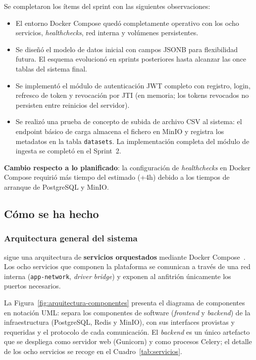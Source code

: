 Se completaron los ítems del sprint con las siguientes observaciones:

\begin{itemize}
  \item El entorno Docker Compose quedó completamente operativo con los ocho
    servicios, \emph{healthchecks}, red interna y volúmenes persistentes.
  \item Se diseñó el modelo de datos inicial con campos JSONB para
    flexibilidad futura.  El esquema evolucionó en sprints posteriores hasta
    alcanzar las once tablas del sistema final.
  \item Se implementó el módulo de autenticación JWT completo con registro,
    login, refresco de token y revocación por \ac{JTI} (en memoria; los tokens
    revocados no persisten entre reinicios del servidor).
  \item Se realizó una prueba de concepto de subida de archivo \ac{CSV} al sistema:
    el endpoint básico de carga almacena el fichero en MinIO y registra los
    metadatos en la tabla \texttt{datasets}.  La implementación completa del
    módulo de ingesta se completó en el Sprint~2.
\end{itemize}

\textbf{Cambio respecto a lo planificado}: la configuración de
\emph{healthchecks} en Docker Compose requirió más tiempo del estimado
(+4h) debido a los tiempos de arranque de PostgreSQL y MinIO.

\subsection{Cómo se ha hecho}

\subsubsection{Arquitectura general del sistema}
\label{sec:arquitectura}

\dataqual sigue una arquitectura de \textbf{servicios orquestados} mediante
Docker Compose~\citep{docker}.  Los ocho servicios que componen la plataforma
se comunican a través de una red interna (\texttt{app-network}, \emph{driver}
\emph{bridge}) y exponen al anfitrión únicamente los puertos necesarios.

La Figura~\ref{fig:arquitectura-componentes} presenta el diagrama de
componentes en notación \ac{UML}: separa los componentes de software
(\emph{frontend} y \emph{backend}) de la infraestructura (PostgreSQL, Redis y
MinIO), con sus interfaces provistas y requeridas y el protocolo de cada
comunicación.  El \emph{backend} es un único artefacto que se despliega como
servidor web (Gunicorn) y como procesos Celery; el detalle de los ocho
servicios se recoge en el Cuadro~\ref{tab:servicios}.

